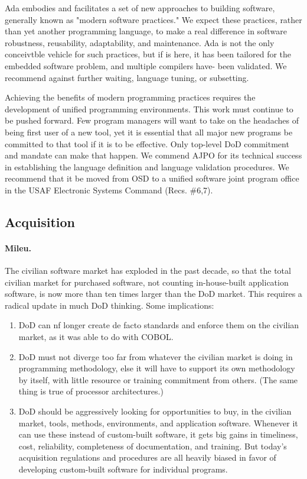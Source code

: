 \documentclass[12pt]{article}
\begin{document}
Ada embodies and facilitates a set of new approaches to building software,
generally known as "modern software practices." We expect these practices,
rather than yet another programming language, to make a real difference in
software robustness, reusability, adaptability, and maintenance. Ada is not
the only conceivtble vehicle for such practices, but if is here, it has been
tailored for the embedded software problem, and multiple compilers have- been
validated. We recommend against further waiting, language tuning, or
subsetting.

Achieving the benefits of modern programming practices requires the development of
unified programming environments. This work must continue to be pushed forward.
Few program managers will want to take on the headaches of being first user of a new
tool, yet it is essential that all major new programs be committed to that tool if it is to
be effective. Only top-level DoD commitment and mandate can make that happen.
We commend AJPO for its technical success in establishing the language definition and
language validation procedures. We recommend that it be moved from OSD to a unified
software joint program office in the USAF Electronic Systems Command (Recs. \#6,7).

\subsection*{Acquisition}

\paragraph{Mileu.} The civilian software market has exploded in the past decade, so that the total
civilian market for purchased software, not counting in-house-built application software, is
now more than ten times larger than the DoD market. This requires a radical update in
much DoD thinking. Some implications:

\begin{enumerate}
\item DoD can nf longer create de facto standards and enforce them on the civilian market,
as it was able to do with COBOL.

\item DoD must not diverge too far from whatever the civilian market is doing in programming methodology, else it will have to support its own methodology by itself, with little
resource or training commitment from others. (The same thing is true of processor
architectures.)

\item DoD should be aggressively looking for opportunities to buy, in the civilian market,
tools, methods, environments, and application software. Whenever it can use these
instead of custom-built software, it gets big gains in timeliness, cost, reliability,
completeness of documentation, and training. But today's acquisition regulations
and procedures are all heavily biased in favor of developing custom-built software
for individual programs.
\end{enumerate}
\end{document}
